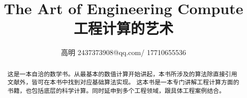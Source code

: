 \documentclass{ctexart}
\title{The Art of Engineering Compute \newline 工程计算的艺术}
\author{高明 2437373908@qq.com/ 17710655536}
\begin{document}
\maketitle

\begin{abstract}
这是一本自洽的数学书。从最基本的数值计算开始讲起，本书所涉及的算法除直接引用文献外，皆可在本书中找到对应基础算法实现。\newline
这本书是一本专门讲解工程计算方面的书籍，也包括底层的科学计算。同时延申到多个工程领域，跟具体工程案例结合。
\end{abstract}
\end{document}
